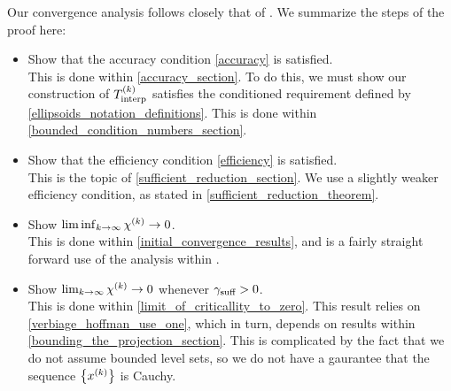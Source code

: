 Our convergence analysis follows closely that of \cite{Conejo:2013:GCT:2620806.2621814}.
We summarize the steps of the proof here:
\begin{itemize}
\item Show that the accuracy condition \cref{accuracy} is satisfied. \\
This is done within \cref{accuracy_section}. 
To do this, we must show our construction of ${T_{\text{interp}}^{(k)}}$ satisfies the conditioned requirement defined by \cref{ellipsoids_notation_definitions}.
This is done within \cref{bounded_condition_numbers_section}.
\item Show that the efficiency condition \cref{efficiency} is satisfied. \\
This is the topic of \cref{sufficient_reduction_section}.
We use a slightly weaker efficiency condition, as stated in \cref{sufficient_reduction_theorem}.
\item Show $\liminf_{k\to\infty} {\chi^{(k)}} \to 0$. \\
This is done within \cref{initial_convergence_results}, and is a fairly straight forward use of the analysis within \cite{Conejo:2013:GCT:2620806.2621814}.
\item Show $\lim_{k\to\infty} {\chi^{(k)}} \to 0$ whenever $\gamma_{\textrm{suff}} > 0$. \\
This is done within \cref{limit_of_criticallity_to_zero}.
This result relies on \cref{verbiage_hoffman_use_one}, which in turn, depends on results within \cref{bounding_the_projection_section}.
This is complicated by the fact that we do not assume bounded level sets, so we do not have a gaurantee that the sequence $\left\{x^{(k)}\right\}$ is Cauchy.

\end{itemize}

